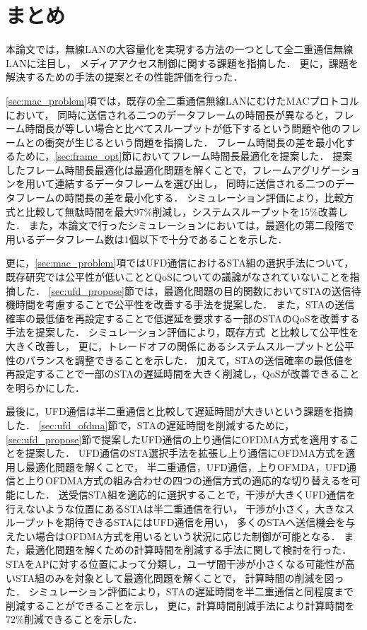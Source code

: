 \documentclass[master]{kuisthesis}		%
\begin{document}
\section{まとめ}
	本論文では，無線LANの大容量化を実現する方法の一つとして全二重通信無線LANに注目し，
	メディアアクセス制御に関する課題を指摘した．
	更に，課題を解決するための手法の提案とその性能評価を行った．
	\par
	\ref{sec:mac_problem}項では，既存の全二重通信無線LANにむけたMACプロトコルにおいて，
	同時に送信される二つのデータフレームの時間長が異なると，フレーム時間長が等しい場合と比べてスループットが低下するという問題や他のフレームとの衝突が生じるという問題を指摘した．
	フレーム時間長の差を最小化するために，\ref{sec:frame_opt}節においてフレーム時間長最適化を提案した．
	提案したフレーム時間長最適化は最適化問題を解くことで，フレームアグリゲーションを用いて連結するデータフレームを選び出し，
	同時に送信される二つのデータフレームの時間長の差を最小化する．
	シミュレーション評価により，比較方式と比較して無駄時間を最大97\%削減し，システムスループットを15\%改善した．
	また，本論文で行ったシミュレーションにおいては，最適化の第二段階で用いるデータフレーム数は1個以下で十分であることを示した．
	\par
	更に，\ref{sec:mac_problem}項ではUFD通信におけるSTA組の選択手法について，
	既存研究では公平性が低いこととQoSについての議論がなされていないことを指摘した．
	\ref{sec:ufd_propose}節では，最適化問題の目的関数においてSTAの送信待機時間を考慮することで公平性を改善する手法を提案した．
	また，STAの送信確率の最低値を再設定することで低遅延を要求する一部のSTAのQoSを改善する手法を提案した．
	シミュレーション評価により，既存方式~\cite{promac}と比較して公平性を大きく改善し，
	更に，トレードオフの関係にあるシステムスループットと公平性のバランスを調整できることを示した．
	加えて，STAの送信確率の最低値を再設定することで一部のSTAの遅延時間を大きく削減し，QoSが改善できることを明らかにした．
	\par
	最後に，UFD通信は半二重通信と比較して遅延時間が大きいという課題を指摘した．
	\ref{sec:ufd_ofdma}節で，STAの遅延時間を削減するために，
	\ref{sec:ufd_propose}節で提案したUFD通信の上り通信にOFDMA方式を適用することを提案した．
	UFD通信のSTA選択手法を拡張し上り通信にOFDMA方式を適用し最適化問題を解くことで，
	半二重通信，UFD通信，上りOFMDA，UFD通信と上りOFDMA方式の組み合わせの四つの通信方式の適応的な切り替えるを可能にした．
	送受信STA組を適応的に選択することで，干渉が大きくUFD通信を行えないような位置にあるSTAは半二重通信を行い，
	干渉が小さく，大きなスループットを期待できるSTAにはUFD通信を用い，
	多くのSTAへ送信機会を与えたい場合はOFDMA方式を用いるという状況に応じた制御が可能となる．
	また，最適化問題を解くための計算時間を削減する手法に関して検討を行った．
	STAをAPに対する位置によって分類し，ユーザ間干渉が小さくなる可能性が高いSTA組のみを対象として最適化問題を解くことで，
	計算時間の削減を図った．
	シミュレーション評価により，STAの遅延時間を半二重通信と同程度まで削減することができることを示し，
	更に，計算時間削減手法により計算時間を72\%削減できることを示した．
\end{document}

